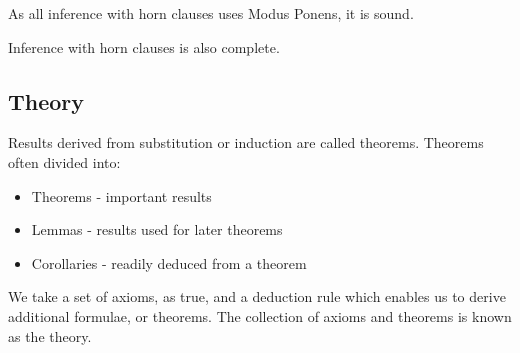 As all inference with horn clauses uses Modus Ponens, it is sound.

Inference with horn clauses is also complete.

\subsection{Theory}

Results derived from substitution or induction are called theorems. Theorems often divided into:

\begin{itemize}
\item Theorems - important results
\item Lemmas - results used for later theorems
\item Corollaries - readily deduced from a theorem
\end{itemize}

We take a set of axioms, as true, and a deduction rule which enables us to derive additional formulae, or theorems. The collection of axioms and theorems is known as the theory.
